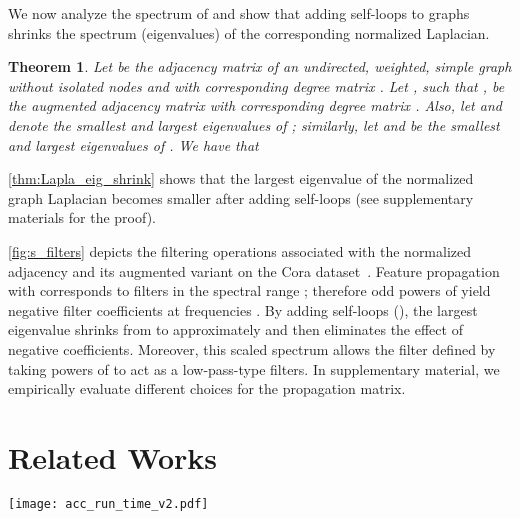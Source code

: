 \documentclass{article}
\newtheorem{theorem}{Theorem}
\newcommand{\method}{SGC}
\begin{document}
We now analyze the spectrum of  and show that adding self-loops to graphs shrinks the spectrum (eigenvalues) of the corresponding normalized Laplacian.

\begin{theorem}\label{thm:Lapla_eig_shrink} Let  be the adjacency matrix of an undirected, weighted, simple graph  without isolated nodes and with corresponding degree matrix . Let , such that , be the augmented adjacency matrix with corresponding degree matrix . Also, let  and  denote the smallest and largest eigenvalues of ; similarly, let  and  be the smallest and largest eigenvalues of . We have that

\end{theorem}
\autoref{thm:Lapla_eig_shrink} shows that the largest eigenvalue of the normalized graph Laplacian becomes smaller after adding self-loops  (see supplementary materials for the proof).

\autoref{fig:s_filters} depicts the filtering operations associated with the normalized adjacency  and its augmented variant  on the Cora dataset~\citep{sen2008collective}. Feature propagation with  corresponds to filters  in the spectral range ; therefore odd powers of  yield negative filter coefficients at frequencies . By adding self-loops (), the largest eigenvalue shrinks from  to approximately  and then eliminates the effect of negative coefficients. Moreover, this scaled spectrum allows the filter defined by taking powers  of  to act as a low-pass-type filters. In supplementary material, we empirically evaluate different choices for the propagation matrix. 

\section{Related Works}


\begin{figure*}[tb!] 
\centering
\texttt{[image: acc\_run\_time\_v2.pdf]}
\caption{Performance over training time on Pubmed and Reddit. \method{} is the fastest while achieving competitive performance. 
We are not able to benchmark the training time of GaAN and DGI on Reddit because the implementations are not released. 
}
\label{fig:run_time}
\end{figure*}
\end{document}
